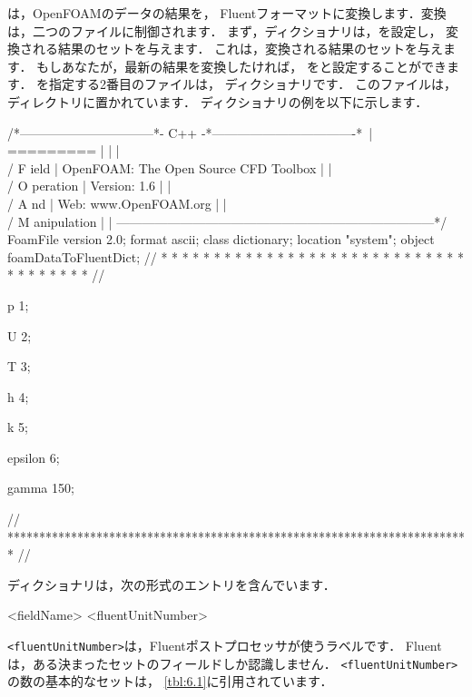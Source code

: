 は，OpenFOAMのデータの結果を，
Fluentフォーマットに変換します．変換は，二つのファイルに制御されます．
まず，ディクショナリは，を設定し，
変換される結果のセットを与えます．
これは，変換される結果のセットを与えます．
もしあなたが，最新の結果を変換したければ，
をと設定することができます．
を指定する2番目のファイルは，
ディクショナリです．
このファイルは，ディレクトリに置かれています．
ディクショナリの例を以下に示します．
\begin{OFverbatim}
/*--------------------------------*- C++ -*----------------------------------*\
| =========                 |                                                 |
| \\      /  F ield         | OpenFOAM: The Open Source CFD Toolbox           |
|  \\    /   O peration     | Version:  1.6                                   |
|   \\  /    A nd           | Web:      www.OpenFOAM.org                      |
|    \\/     M anipulation  |                                                 |
\*---------------------------------------------------------------------------*/
FoamFile
{
    version    2.0;
    format     ascii;
    class      dictionary;
    location   "system";
    object     foamDataToFluentDict;
}
// * * * * * * * * * * * * * * * * * * * * * * * * * * * * * * * * * * * * * //

p               1;

U               2;

T               3;

h               4;

k               5;

epsilon         6;

gamma           150;


// ************************************************************************* //
\end{OFverbatim}
ディクショナリは，次の形式のエントリを含んでいます．
\begin{OFverbatim}[file]
<fieldName> <fluentUnitNumber>
\end{OFverbatim}
\verb|<fluentUnitNumber>|は，Fluentポストプロセッサが使うラベルです．
Fluentは，ある決まったセットのフィールドしか認識しません．
\verb|<fluentUnitNumber>|の数の基本的なセットは，
\autoref{tbl:6.1}に引用されています．


